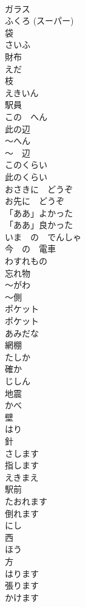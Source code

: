 \documentclass[8pt]{extreport}
\begin{document}
\begin{CJK}{UTF8}{min}
\\	ガラス		
\\	ふくろ (スーパー)	
\\	袋	
\\	さいふ	
\\	財布	
\\	えだ	
\\	枝		
\\	えきいん	
\\	駅員		
\\	この　へん	
\\	此の辺	
\\	〜へん	
\\	〜　辺		
\\	このくらい	
\\	此のくらい	
\\	おさきに　どうぞ	
\\	お先に　どうぞ	
\\	「ああ」よかった	
\\	「ああ」良かった	
\\	いま　の　でんしゃ	
\\	今　の　電車		
\\	わすれもの	
\\	忘れ物	
\\	〜がわ	
\\	〜側		
\\	ポケット	
\\	ポケット		
\\	あみだな	
\\	網棚		
\\	たしか	
\\	確か		
\\	じしん	
\\	地震		
\\	かべ	
\\	壁		
\\	はり	
\\	針		
\\	さします	
\\	指します		
\\	えきまえ	
\\	駅前		
\\	たおれます	
\\	倒れます		
\\	にし	
\\	西		
\\	ほう	
\\	方		
\\	はります	
\\	張ります	
\\	かけます	

\end{CJK}
\end{document}
